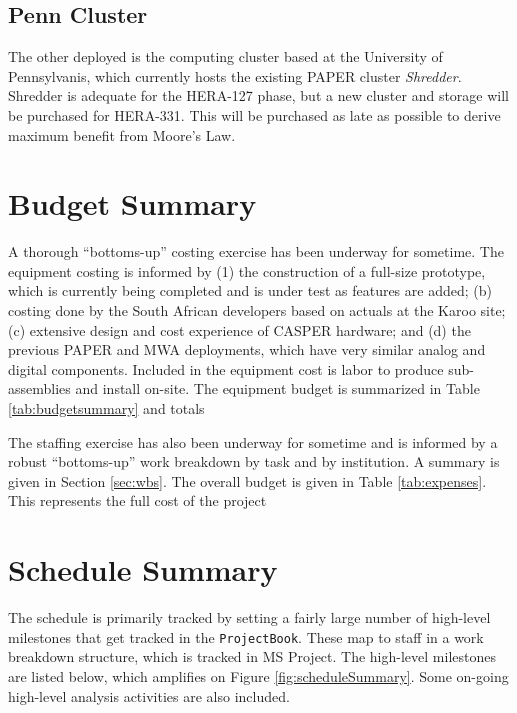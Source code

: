 \documentclass[preprint]{aastex}
\begin{document}
\subsection{Penn Cluster}
The other deployed is the computing cluster based at the University of Pennsylvanis, which currently hosts the existing
PAPER cluster {\em Shredder}.  Shredder is adequate for the HERA-127 phase, but a new cluster and storage will be
purchased for HERA-331.  This will be purchased as late as possible to derive maximum benefit from Moore's Law.



\section{Budget Summary}
\label{sec:budget}
A thorough ``bottoms-up'' costing exercise has been underway for sometime. The
equipment costing is informed by (1) the construction of a full-size prototype, which
is currently being completed and is under test as features are added; (b) costing
done by the South African developers based on actuals at the Karoo site; (c)
extensive design and cost experience of CASPER hardware; and (d) the previous PAPER
and MWA deployments, which have very similar analog and digital components. Included
in the equipment cost is labor to produce sub-assemblies and install on-site. The
equipment budget is summarized in Table \ref{tab:budgetsummary} and totals

%

The staffing exercise has also been underway for sometime and is informed by a robust
``bottoms-up'' work breakdown by task and by institution. A summary is given in Section \ref{sec:wbs}.
The overall budget is given in Table \ref{tab:expenses}.  This represents the full cost of the project


\section{Schedule Summary}
\label{sec:schedule}
The schedule is primarily tracked by setting a fairly large number of high-level
milestones that get tracked in the {\tt ProjectBook}. These map to staff in a work
breakdown structure, which is tracked in MS Project. The high-level milestones are
listed below, which amplifies on Figure \ref{fig:scheduleSummary}.  Some on-going
high-level analysis activities are also included.
\end{document}
